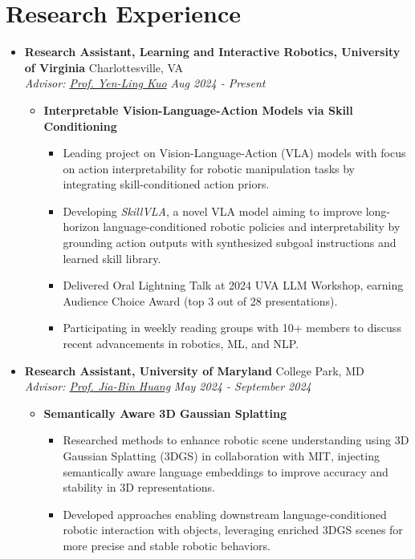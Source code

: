 \documentclass[letterpaper,11pt]{article}
\newcommand{\Date}[1]{\textit{\small #1}}
\newcommand{\heading}[4]{
  \textbf{#1} \hfill #2 \\
  \textit{\small#3} \hfill \Date{#4}
}
\begin{document}
\section{Research Experience}
\begin{itemize}[label={}, leftmargin=0pt]
  \item \heading{Research Assistant, Learning and Interactive Robotics, University of Virginia}{Charlottesville, VA}
        {Advisor: \href{https://yenlingkuo.com/}{Prof. Yen-Ling Kuo}}{Aug 2024 - Present}
        \begin{itemize}
          \item \textbf{Interpretable Vision-Language-Action Models via Skill Conditioning}
                \begin{itemize}
                  \item Leading project on Vision-Language-Action (VLA) models with focus on action interpretability for robotic manipulation tasks by integrating skill-conditioned action priors.
                  \item Developing \textit{SkillVLA}, a novel VLA model aiming to improve long-horizon language-conditioned
                        robotic policies and interpretability by grounding action outputs with synthesized subgoal instructions and learned skill library.
                  \item Delivered Oral Lightning Talk at 2024 UVA LLM Workshop, earning Audience Choice Award (top 3 out of 28 presentations).
                  \item Participating in weekly reading groups with 10+ members to discuss recent advancements in robotics, ML, and NLP.
                \end{itemize}
        \end{itemize}
  \item \heading{Research Assistant, University of Maryland}{College Park, MD}
        {Advisor: \href{https://jbhuang0604.github.io/}{Prof. Jia-Bin Huang}}{May 2024 - September 2024}
        \begin{itemize}
          \item \textbf{Semantically Aware 3D Gaussian Splatting}
                \begin{itemize}
                  \item Researched methods to enhance robotic scene understanding using 3D Gaussian Splatting (3DGS) in collaboration with MIT, injecting semantically aware language embeddings to improve accuracy and stability in 3D representations.
                  \item Developed approaches enabling downstream language-conditioned robotic interaction with objects, leveraging enriched 3DGS scenes for more precise and stable robotic behaviors.

\end{itemize}
\end{itemize}
\end{itemize}
\end{document}
